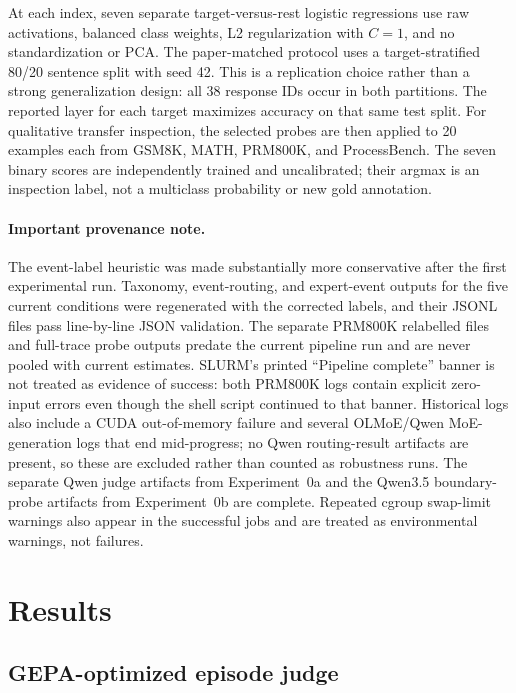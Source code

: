 \documentclass[manuscript,screen,review]{jair}
\begin{document}
At each index, seven separate target-versus-rest logistic regressions use raw
activations, balanced class weights, L2 regularization with $C=1$, and no
standardization or PCA.  The paper-matched protocol uses a target-stratified
80/20 sentence split with seed 42.  This is a replication choice rather than
a strong generalization design: all 38 response IDs occur in both partitions.
The reported layer for each target maximizes accuracy on that same test split.
For qualitative transfer inspection, the selected probes are then applied to
20 examples each from GSM8K, MATH, PRM800K, and ProcessBench.  The seven binary
scores are independently trained and uncalibrated; their argmax is an
inspection label, not a multiclass probability or new gold annotation.

\paragraph{Important provenance note.}
The event-label heuristic was made substantially more conservative after the
first experimental run.  Taxonomy, event-routing, and expert-event outputs
for the five current conditions were regenerated with the corrected labels,
and their JSONL files pass line-by-line JSON validation.  The separate
PRM800K relabelled files and full-trace probe outputs predate the current
pipeline run and are never pooled with current estimates.  SLURM's printed
``Pipeline complete'' banner is not treated as evidence of success: both
PRM800K logs contain explicit zero-input errors even though the shell script
continued to that banner.  Historical logs also include a CUDA out-of-memory
failure and several OLMoE/Qwen MoE-generation logs that end mid-progress; no
Qwen routing-result artifacts are present, so these are excluded rather than
counted as robustness runs.  The separate Qwen judge artifacts from
Experiment~0a and the Qwen3.5 boundary-probe artifacts from Experiment~0b are
complete.  Repeated cgroup swap-limit warnings also appear in the successful
jobs and are treated as environmental warnings, not failures.

\section{Results}

\subsection{GEPA-optimized episode judge}
\end{document}
